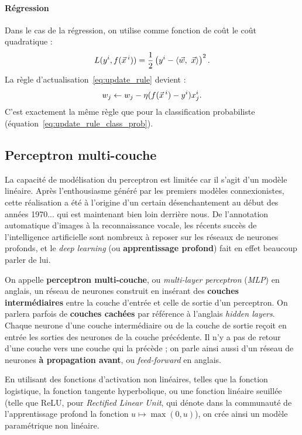 \paragraph{Régression}
Dans le cas de la régression, on utilise comme fonction de coût le
coût quadratique :
\begin{equation}
  L(y^i, f(\xx^i)) = 
  \frac12 \left(y^i - \innerproduct{\ww,~\xx}\right)^2.
\end{equation}
La règle d'actualisation~\eqref{eq:update_rule} devient :
\begin{equation}
  \label{eq:update_rule_reg}
  w_j \leftarrow w_j - \eta (f(\xx^i) - y^i) x_j^i.
\end{equation}
C'est exactement la même règle que pour la classification probabiliste (équation~\eqref{eq:update_rule_class_prob}).



\subsection{Perceptron multi-couche}
\label{sec:mlp}
La capacité de modélisation du perceptron est limitée car il s'agit d'un modèle
linéaire. Après l'enthousiasme généré par les premiers modèles connexionistes,
cette réalisation a été à l'origine d'un certain désenchantement au début des
années 1970... qui est maintenant bien loin derrière nous.
De l'annotation automatique d'images à la reconnaissance vocale, les récents
succès de l'intelligence artificielle sont nombreux à reposer sur les réseaux
de neurones profonds, et le {\it deep learning} (ou \textbf{apprentissage
  profond}) fait en effet beaucoup parler de lui.

On appelle \textbf{perceptron multi-couche}, ou {\it multi-layer perceptron}
({\it MLP}) en anglais, un réseau de neurones construit en insérant des
\textbf{couches intermédiaires} entre la couche d'entrée et celle de sortie
d'un perceptron. On parlera parfois de \textbf{couches cachées} par référence à
l'anglais {\it hidden layers}. Chaque neurone d'une couche intermédiaire ou de
la couche de sortie reçoit en entrée les sorties des neurones de la couche
précédente. Il n'y a pas de retour d'une couche vers une couche qui la précède
; on parle ainsi aussi d'un réseau de neurones \textbf{à propagation avant}, ou
{\it feed-forward} en anglais.
  
En utilisant des fonctions d'activation non linéaires, telles que la fonction
logistique, la fonction tangente hyperbolique, ou une fonction linéaire
seuillée (telle que ReLU, pour {\it Rectified Linear Unit}, qui dénote dans la
communauté de l'apprentissage profond la fonction $u \mapsto \max(0, u)$), on
crée ainsi un modèle paramétrique non linéaire.

